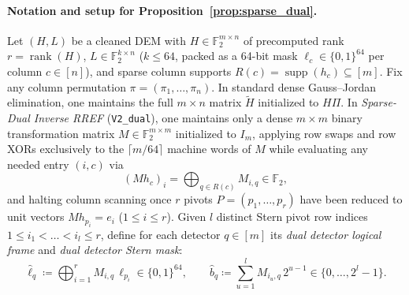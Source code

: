 \documentclass[12pt]{article}
\theoremstyle{definition}
\newcommand{\Ftwo}{\mathbb{F}_2}
\DeclareMathOperator{\supp}{supp}
\DeclareMathOperator{\rank}{rank}
\newcommand{\ttt}[1]{\texttt{#1}}
\begin{document}
\paragraph{Notation and setup for Proposition~\ref{prop:sparse_dual}.}
Let $(H, L)$ be a cleaned DEM with $H \in \Ftwo^{m \times n}$ of precomputed rank $r = \rank(H)$, $L \in \Ftwo^{k
\times n}$ ($k \le 64$, packed as a 64-bit mask $\ell_c \in \{0, 1\}^{64}$ per column $c \in [n]$), and sparse
column supports $R(c) = \supp(h_c) \subseteq [m]$. Fix any column permutation $\pi = (\pi_1, \dots, \pi_n)$. In
standard dense Gauss--Jordan elimination, one maintains the full $m \times n$ matrix $\widetilde{H}$ initialized to
$H \Pi$. In \emph{Sparse-Dual Inverse RREF} (\ttt{V2\_dual}), one maintains only a dense $m \times m$ binary
transformation matrix $M \in \Ftwo^{m \times m}$ initialized to $I_m$, applying row swaps and row XORs exclusively
to the $\lceil m / 64 \rceil$ machine words of $M$ while evaluating any needed entry $(i, c)$ via
\begin{equation}\label{eq:dual_entry}
  (M h_c)_i = \bigoplus_{q \in R(c)} M_{i, q} \in \Ftwo,
\end{equation}
and halting column scanning once $r$ pivots $P = (p_1, \dots, p_r)$ have been reduced to unit vectors $M h_{p_i} =
e_i$ ($1 \le i \le r$). Given $l$ distinct Stern pivot row indices $1 \le i_1 < \dots < i_l \le r$, define for each
detector $q \in [m]$ its \emph{dual detector logical frame} and \emph{dual detector Stern mask}:
\begin{equation}\label{eq:detector_frames}
  \hat{\ell}_q \coloneqq \bigoplus_{i=1}^r M_{i, q}\,\ell_{p_i} \in \{0, 1\}^{64}, \qquad
  \hat{b}_q \coloneqq \sum_{u=1}^l M_{i_u, q}\,2^{u-1} \in \{0, \dots, 2^l - 1\}.
\end{equation}
\end{document}
